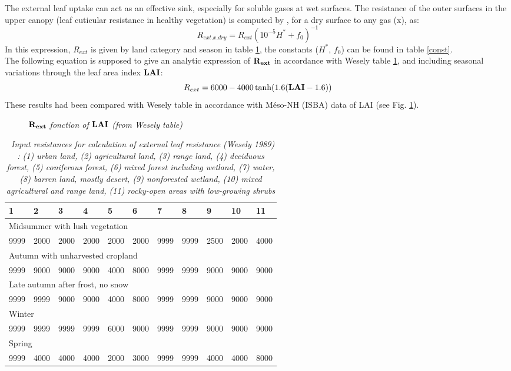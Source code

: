 The external leaf uptake can act as an effective sink, especially for soluble
gases at wet surfaces. 
The resistance of the outer surfaces in the upper canopy (leaf cuticular
resistance in healthy vegetation) is computed by \cite{Wesely1989}, for a
dry surface to any gas (x), as:
\[R_{ext.x.dry}=R_{ext}(10^{-5}H^*+f_0)^{-1}\]
In this expression, $R_{ext}$ is given by land category and season in table
\ref{resdebase},  the constants ($H^*$, $f_0$) can be found in table 
\ref{const}.\\
The following equation is supposed to give an analytic expression of
$\bf{R_{ext}}$ in accordance with Wesely table \ref{resdebase}, and 
including seasonal variations through the leaf area index $\bf LAI$:
\[R_{ext}=6000 - 4000 \tanh(1.6( {\bf{LAI}} -1.6))\]
These results had been compared with Wesely table in accordance with 
Méso-NH (ISBA) data of LAI (see Fig. \ref{lai_rext}).
\begin{figure}
\centerline{}
\label{lai_rext}
\caption{\sl{$\bf{R_{ext}}$ fonction of $\bf{LAI}$ (from Wesely table)}}
\end{figure}

\begin{table}
\begin{center}
\begin{tabular}{lllllllllll}
\hline
1&2&3&4&5&6&7&8&9&10&11 \\ \hline
\multicolumn{11}{l}{Midsummer with lush vegetation}\\
9999 & 2000& 2000&   2000   & 2000  & 2000  & 9999 & 9999 & 2500 & 2000 & 4000
\\
\multicolumn{11}{l}{Autumn with unharvested cropland}\\
9999 & 9000& 9000&   9000   & 4000  & 8000  & 9999 & 9999 & 9000 & 9000 & 9000
\\
\multicolumn{11}{l}{Late autumn after frost, no snow}\\
9999 & 9999 & 9000&   9000   & 4000  & 8000  & 9999 & 9999 & 9000 & 9000 & 9000
\\
\multicolumn{11}{l}{Winter}\\
9999 & 9999 & 9999 & 9999 & 6000  & 9000  & 9999 & 9999 & 9000 & 9000 & 9000
\\
\multicolumn{11}{l}{Spring}\\
9999 & 4000& 4000&   4000   & 2000  & 3000  & 9999& 9999&  4000 & 4000 & 8000
\\ \hline
\end{tabular}
\caption { \sl~{Input resistances for calculation of external leaf resistance
(Wesely 1989) : (1) urban land, (2) agricultural land, (3) range land,
(4) deciduous forest, (5) coniferous forest, (6) mixed forest
including wetland, (7) water, (8) barren land, mostly desert,
(9) nonforested wetland, (10) mixed agricultural and range land,
(11) rocky-open areas with low-growing shrubs}} 
\label{resdebase}

\end{center}
\end{table}

